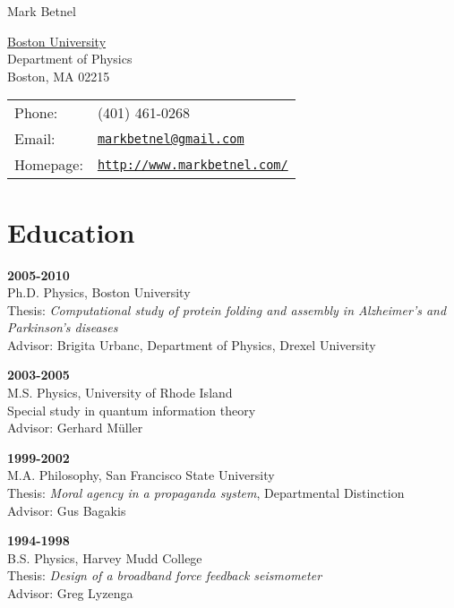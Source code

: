 \documentclass[letterpaper]{article}
\def\name{Mark Betnel}
\renewenvironment{itemize}{
  \begin{list}{}{
    \setlength{\leftmargin}{1.5em}
  }
}{
  \end{list}
}
\begin{document}
{\huge \name}


\vspace{0.25in}

\begin{minipage}{0.45\linewidth}
  \href{http://buphy.bu.edu/}{Boston University} \\
  Department of Physics \\
  Boston, MA 02215 
  \end{minipage}
\begin{minipage}{0.45\linewidth}
  \begin{tabular}{ll}
    Phone: & (401) 461-0268 \\
    Email: & \href{mailto:markbetnel@gmail.com}{\tt markbetnel@gmail.com} \\
    Homepage: & \href{http://www.markbetnel.com/}{\tt http://www.markbetnel.com/} \\
  \end{tabular}
\end{minipage}




\section*{Education}
\begin{itemize}
  \item \textbf{2005-2010} \\
      Ph.D. 	Physics, 	Boston University\\
	  Thesis: \emph{Computational study of protein folding and assembly in Alzheimer's and Parkinson's diseases} \\
	  Advisor: Brigita Urbanc, Department of Physics, Drexel University 
  \item 	\textbf{2003-2005} \\
	  M.S. 	Physics, University of Rhode Island \\
	  Special study in quantum information theory \\
      Advisor: Gerhard M\"{u}ller 
  \item     \textbf{1999-2002} \\
      M.A. Philosophy, San Francisco State University \\
	  Thesis: \emph{Moral agency in a propaganda system}, Departmental Distinction \\
	  Advisor: Gus Bagakis 
  \item     \textbf{1994-1998} \\
	  B.S. Physics, Harvey Mudd College \\
	  Thesis: \emph{Design of a broadband force feedback seismometer} \\
      Advisor: Greg Lyzenga
\end{itemize}
\end{document}
